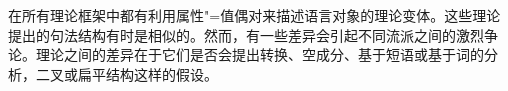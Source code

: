 在所有理论框架中都有利用属性"=值偶对来描述语言对象的理论变体。这些理论提出的句法结构有时是相似的。然而，有一些差异会引起不同流派之间的激烈争论。理论之间的差异在于它们是否会提出转换、空成分、基于短语或基于词的分析，二叉或扁平结构这样的假设。

